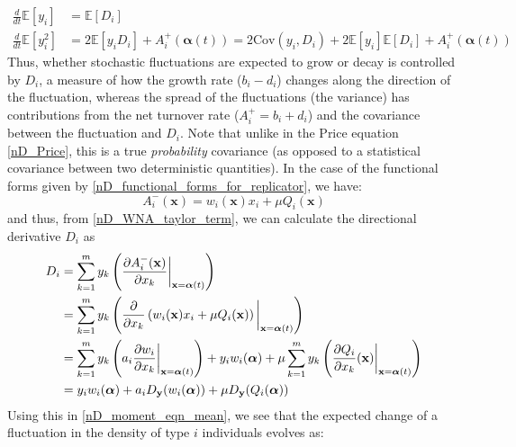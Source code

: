 \begin{align}
\frac{d}{dt}\mathbb{E}[y_i] &= \mathbb{E}[D_{i}]\label{nD_moment_eqn_mean}\\
\frac{d}{dt}\mathbb{E}[y_i^2] &= 2\mathbb{E}[y_iD_{i}] +  A_i^+(\boldsymbol{\alpha}(t)) = 2\mathrm{Cov}(y_i,D_i) + 2\mathbb{E}[y_i]\mathbb{E}[D_i]+A_i^+(\boldsymbol{\alpha}(t))\label{nD_moment_eqn_2nd_mom}
\end{align}
Thus, whether stochastic fluctuations are expected to grow or decay is controlled by $D_i$, a measure of how the growth rate ($b_i - d_i$) changes along the direction of the fluctuation, whereas the spread of the fluctuations (the variance) has contributions from the net turnover rate ($A_i^+ = b_i + d_i$) and the covariance between the fluctuation and $D_i$. Note that unlike in the Price equation \eqref{nD_Price}, this is a true \emph{probability} covariance (as opposed to a statistical covariance between two deterministic quantities). In the case of the functional forms given by \eqref{nD_functional_forms_for_replicator}, we have:
\begin{equation}
A_i^-(\mathbf{x}) = w_i(\mathbf{x})x_i + \mu Q_i(\mathbf{x})
\end{equation}
and thus, from \eqref{nD_WNA_taylor_term}, we can calculate the directional derivative $D_i$ as
\begin{align}
D_i &= \sum\limits_{k=1}^{m} y_k\left(\frac{\partial A^{-}_i(\mathbf{x})}{\partial x_k}\bigg{|}_{\mathbf{x}=\boldsymbol{\alpha}(t)}\right)\\
&= \sum\limits_{k=1}^{m} y_k\left(\frac{\partial}{\partial x_k}\left( w_i(\mathbf{x})x_i + \mu Q_i(\mathbf{x})\right)\bigg{|}_{\mathbf{x}=\boldsymbol{\alpha}(t)}\right)\\
&= \sum\limits_{k=1}^{m} y_k\left(a_i\frac{\partial w_i}{\partial x_k}\bigg{|}_{\mathbf{x}=\boldsymbol{\alpha}(t)}\right) + y_iw_i(\boldsymbol{\alpha}) + \mu\sum\limits_{k=1}^{m} y_k\left(\frac{\partial Q_i}{\partial x_k}(\mathbf{x})\bigg{|}_{\mathbf{x}=\boldsymbol{\alpha}(t)}\right)\\
&= y_iw_i(\boldsymbol{\alpha}) + a_iD_{\mathbf{y}}(w_i(\boldsymbol{\alpha})) + \mu D_{\mathbf{y}}(Q_i(\boldsymbol{\alpha}))\label{nD_WNA_directional_derivative_for_replicator_eqns}
\end{align}
Using this in \eqref{nD_moment_eqn_mean}, we see that the expected change of a fluctuation in the density of type $i$ individuals evolves as:
